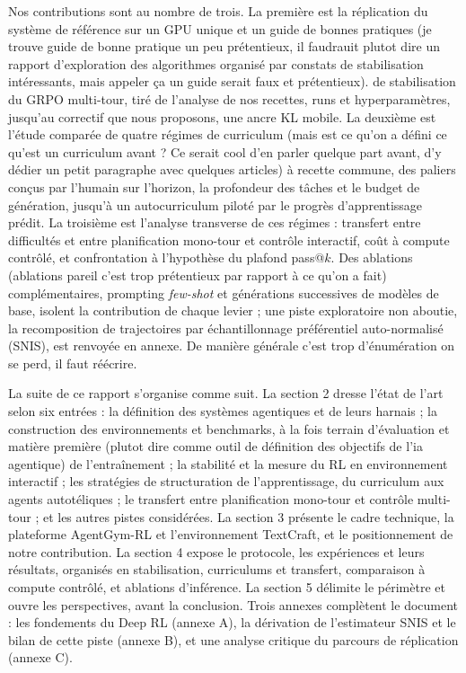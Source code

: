 \documentclass[11pt,a4paper]{article}
\begin{document}
Nos contributions sont au nombre de trois. La première est la réplication du système de référence sur un GPU unique et un guide de bonnes pratiques (je trouve guide de bonne pratique un peu prétentieux, il faudrauit plutot dire un rapport d'exploration des algorithmes organisé par constats de stabilisation intéressants, mais appeler ça un guide serait faux et prétentieux). de stabilisation du GRPO multi-tour, tiré de l'analyse de nos recettes, runs et hyperparamètres, jusqu'au correctif que nous proposons, une ancre KL mobile. La deuxième est l'étude comparée de quatre régimes de curriculum (mais est ce qu'on a défini ce qu'est un curriculum avant ? Ce serait cool d'en parler quelque part avant, d'y dédier un petit paragraphe avec quelques articles) à recette commune, des paliers conçus par l'humain sur l'horizon, la profondeur des tâches et le budget de génération, jusqu'à un autocurriculum piloté par le progrès d'apprentissage prédit. La troisième est l'analyse transverse de ces régimes : transfert entre difficultés et entre planification mono-tour et contrôle interactif, coût à compute contrôlé, et confrontation à l'hypothèse du plafond pass@$k$. Des ablations (ablations pareil c'est trop prétentieux par rapport à ce qu'on a fait) complémentaires, prompting \emph{few-shot} et générations successives de modèles de base, isolent la contribution de chaque levier ; une piste exploratoire non aboutie, la recomposition de trajectoires par échantillonnage préférentiel auto-normalisé (SNIS), est renvoyée en annexe.
De manière générale c'est trop d'énumération on se perd, il faut réécrire.

La suite de ce rapport s'organise comme suit. La section 2 dresse l'état de l'art selon six entrées : la définition des systèmes agentiques et de leurs harnais ; la construction des environnements et benchmarks, à la fois terrain d'évaluation et matière première (plutot dire comme outil de définition des objectifs de l'ia agentique) de l'entraînement ; la stabilité et la mesure du RL en environnement interactif ; les stratégies de structuration de l'apprentissage, du curriculum aux agents autotéliques ; le transfert entre planification mono-tour et contrôle multi-tour ; et les autres pistes considérées. La section 3 présente le cadre technique, la plateforme AgentGym-RL et l'environnement TextCraft, et le positionnement de notre contribution. La section 4 expose le protocole, les expériences et leurs résultats, organisés en stabilisation, curriculums et transfert, comparaison à compute contrôlé, et ablations d'inférence. La section 5 délimite le périmètre et ouvre les perspectives, avant la conclusion. Trois annexes complètent le document : les fondements du Deep RL (annexe A), la dérivation de l'estimateur SNIS et le bilan de cette piste (annexe B), et une analyse critique du parcours de réplication (annexe C).
\end{document}
